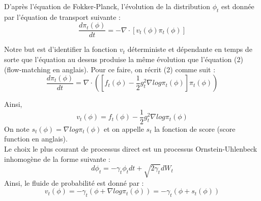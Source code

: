 \documentclass[a4paper,10pt]{article}
\theoremstyle{definition} %
\theoremstyle{definition} %
\theoremstyle{definition} %
\theoremstyle{definition} %
\begin{document}
D'après l'équation de Fokker-Planck, l'évolution de la distribution $\phi_t$ est donnée par l'équation de transport suivante :
\[\frac{d\pi_t(\phi)}{dt} =-\nabla \cdot [v_t(\phi)\pi_t(\phi)]\]

Notre but est d'identifier la fonction $v_t$ déterministe et dépendante en temps de sorte que l'équation au dessus produise la même évolution que l'équation (2) (flow-matching en anglais). Pour ce faire, on récrit (2) comme suit :
\[\frac{d\pi_t(\phi)}{dt} =\nabla \cdot([f_t(\phi)-\frac{1}{2}g_t^2\nabla log\pi_t(\phi)]\pi_t(\phi))\]

Ainsi,
\[v_t(\phi) =f_t(\phi)-\frac{1}{2}g_t^2\nabla log\pi_t(\phi) \]
On note $s_t(\phi) = \nabla log\pi_t(\phi)$ et on appelle $s_t$ la fonction de score (score function en anglais).\\

Le choix le plus courant de processus direct est un processus Ornstein-Uhlenbeck inhomogène de la forme suivante :
\[d\phi_t = -\gamma_t\phi_tdt + \sqrt{2\gamma_t}dW_t\]
Ainsi, le fluide de probabilité est donné par :
\[v_t(\phi) = -\gamma_t(\phi+\nabla log \pi_t(\phi)) = -\gamma_t(\phi+s_t(\phi))\]



 
\end{document}
